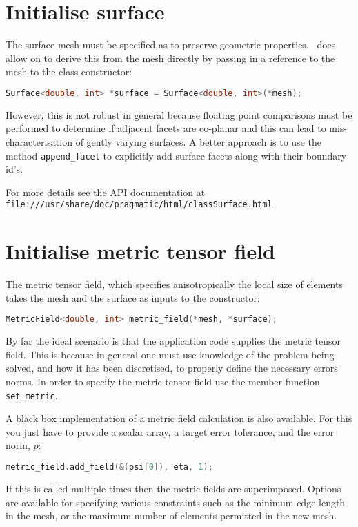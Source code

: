 \section{Initialise surface}
The surface mesh must be specified as to preserve geometric
properties. \pragmatic\ does allow on to derive this from the mesh
directly by passing in a reference to the mesh to the class
constructor:
\begin{lstlisting}[language=C++]
  Surface<double, int> *surface = Surface<double, int>(*mesh);
\end{lstlisting}
However, this is not robust in general because floating point
comparisons must be performed to determine if adjacent facets are
co-planar and this can lead to mis-characterisation of gently varying
surfaces. A better approach is to use the method
\lstinline[language=c++]+append_facet+ to explicitly add surface
facets along with their boundary id's.

For more details see the API documentation at
\lstinline[language=html]+file:///usr/share/doc/pragmatic/html/classSurface.html+
 
\section{Initialise metric tensor field}
The metric tensor field, which specifies anisotropically the local
size of elements takes the mesh and the surface as inputs to the
constructor:
\begin{lstlisting}[language=C++]
  MetricField<double, int> metric_field(*mesh, *surface);
\end{lstlisting}
By far the ideal scenario is that the application code supplies the
metric tensor field. This is because in general one must use knowledge
of the problem being solved, and how it has been discretised, to
properly define the necessary errors norms. In order to specify the
metric tensor field use the member function
\lstinline[language=c++]+set_metric+.

A black box implementation of a metric field calculation is also
available. For this you just have to provide a scalar array, a target
error tolerance, and the error norm, $p$:
\begin{lstlisting}[language=C++]
  metric_field.add_field(&(psi[0]), eta, 1);
\end{lstlisting}
If this is called multiple times then the metric fields are
superimposed. Options are available for specifying various constraints
such as the minimum edge length in the mesh, or the maximum number of
elements permitted in the new mesh.

